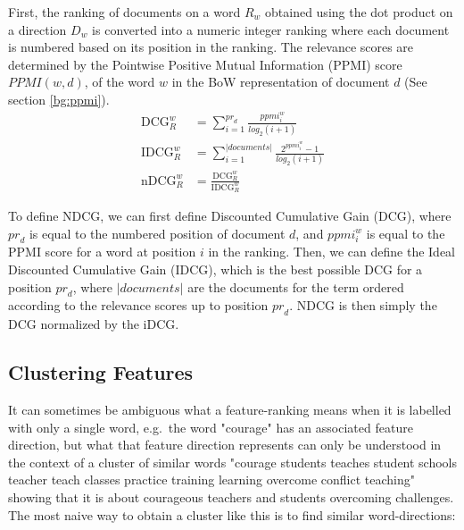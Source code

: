 First, the ranking of documents on a word $R_w$ obtained using the dot product on a direction ${D}_w$ is converted into a numeric integer ranking where each document is numbered based on its position in the ranking. The relevance scores are determined by the Pointwise Positive Mutual Information (PPMI) score $\textit{PPMI}(w,d)$, of the word $w$ in the BoW representation of document $d$ (See section \ref{bg:ppmi}). 
\begin{align*}
\text{DCG}_{R}^{w} &= \sum_{i=1}^{{pr}_d}\frac{\textit{ppmi}_{i}^{w}}{log_{2}(i + 1)} \\
\text{IDCG}_{R}^{w} &= \sum^{|\textit{documents}|}_{i=1} \frac{2^{\textit{ppmi}_{i}^{w}}-1}{log_{2}(i + 1)} \\
\text{nDCG}_{R}^{w} &= \frac{\text{DCG}_{R}^{w}}{\text{IDCG}_{R}^{w}}
\end{align*}  

To define NDCG, we can first define Discounted Cumulative Gain (DCG), where ${pr}_{d}$ is equal to the numbered position of document $d$, and $ppmi_{i}^{w}$ is equal to the PPMI score for a word at position $i$ in the ranking. Then, we can define the Ideal Discounted Cumulative Gain (IDCG), which is the best possible DCG for a position ${pr}_{d}$, where $|documents|$ are the documents for the term ordered according to the relevance scores up to position ${pr}_{d}$. NDCG is then simply the DCG normalized by the iDCG.

\subsection{Clustering Features}\label{ch3:LabellingWords}

 It can sometimes be ambiguous what a feature-ranking means when it is labelled with only a single word, e.g.\ the word "courage" has an associated feature direction, but what that feature direction represents can only be understood in the context of a cluster of similar words "courage students teaches student schools teacher teach classes practice training learning overcome conflict teaching" showing that it is about courageous teachers and students overcoming challenges. The most naive way to obtain a cluster like this is to find similar word-directions: 

